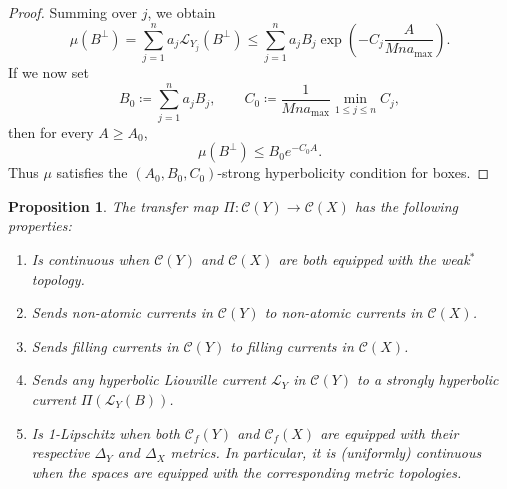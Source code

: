 \documentclass[12pt]{amsart}
\numberwithin{equation}{section}
\numberwithin{figure}{section}
\newtheorem{proposition}[equation]{Proposition}
\theoremstyle{definition}
\theoremstyle{plain}
\newcommand\C{\mathcal{C}}
\begin{document}
\begin{proof}
Summing over $j$, we obtain
\[
\mu(B^\perp)
=
\sum_{j=1}^n a_j \mathcal{L}_{Y_j}(B^\perp)
\le
\sum_{j=1}^n a_j B_j \exp\!\left(- C_j \frac{A}{M n a_{\max}}\right).
\]
If we now set
\[
B_0\coloneqq \sum_{j=1}^n a_j B_j,
\qquad
C_0\coloneqq \frac{1}{M n a_{\max}} \min_{1\le j\le n} C_j,
\]
then for every $A\ge A_0$,
\[
\mu(B^\perp)\le B_0 e^{-C_0A}.
\]
Thus $\mu$ satisfies the $(A_0, B_0, C_0)$-strong hyperbolicity condition for boxes.
\end{proof}

 




\begin{proposition}\label{prop2.7}
The transfer map $\Pi \colon \mathcal{C}(Y) \to \mathcal{C}(X)$ has the following properties:
\begin{enumerate}
\item Is continuous when $\mathcal{C}(Y)$ and $\mathcal{C}(X)$ are both equipped with the weak$^*$ topology.
\item Sends non-atomic currents in $\C(Y)$ to non-atomic currents in $\C(X)$.
\item Sends filling currents in $\C(Y)$ to filling currents in $\C(X)$.
\item Sends any hyperbolic Liouville current $\mathcal{L}_{Y}$ in $\C(Y)$ to a strongly hyperbolic current $\Pi(\mathcal{L}_{Y}(B))$.
\item Is 1-Lipschitz when both $\mathcal{C}_{f}(Y)$ and $\mathcal{C}_{f}(X)$ are equipped with their respective $\Delta_Y$ and $\Delta_X$ metrics. In particular, it is (uniformly) continuous when the spaces are equipped with the corresponding metric topologies.
\end{enumerate}
\label{prop:push}
\end{proposition}
\end{document}

